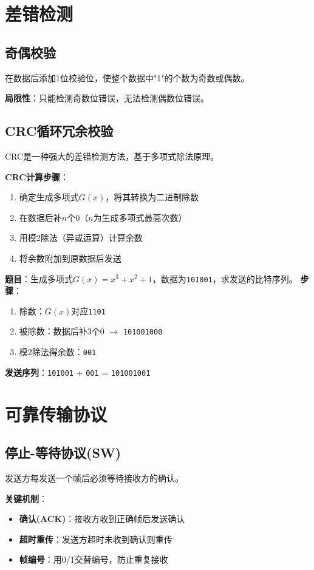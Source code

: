 \section{差错检测}
\subsection{奇偶校验}
在数据后添加1位校验位，使整个数据中"1"的个数为奇数或偶数。

\textbf{局限性}：只能检测奇数位错误，无法检测偶数位错误。

\subsection{CRC循环冗余校验}
CRC是一种强大的差错检测方法，基于多项式除法原理。

\textbf{CRC计算步骤}：
\begin{enumerate}[leftmargin=2em,itemsep=0pt]
    \item 确定生成多项式$G(x)$，将其转换为二进制除数
    \item 在数据后补$n$个0（$n$为生成多项式最高次数）
    \item 用模2除法（异或运算）计算余数
    \item 将余数附加到原数据后发送
\end{enumerate}

\begin{examplebox}[例题3.1 CRC计算]
\textbf{题目}：生成多项式$G(x)=x^3+x^2+1$，数据为\texttt{101001}，求发送的比特序列。
\tcblower
\textbf{步骤}：
\begin{enumerate}[itemsep=0pt]
    \item 除数：$G(x)$对应\texttt{1101}
    \item 被除数：数据后补3个0 $\rightarrow$ \texttt{101001000}
    \item 模2除法得余数：\texttt{001}
\end{enumerate}
\textbf{发送序列}：\texttt{101001} + \texttt{001} = \texttt{101001001}
\end{examplebox}

\section{可靠传输协议}
\subsection{停止-等待协议(SW)}
发送方每发送一个帧后必须等待接收方的确认。

\textbf{关键机制}：
\begin{itemize}[leftmargin=2em,itemsep=0pt]
    \item \textbf{确认(ACK)}：接收方收到正确帧后发送确认
    \item \textbf{超时重传}：发送方超时未收到确认则重传
    \item \textbf{帧编号}：用0/1交替编号，防止重复接收
\end{itemize}


